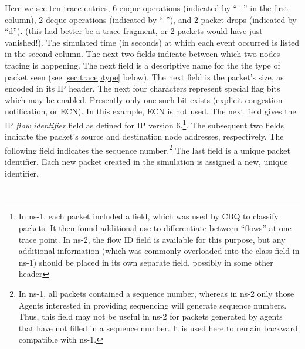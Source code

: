 Here we see ten trace entries, 6 enque operations (indicated by ``+''
in the first column), 2 deque operations (indicated by ``-''),
and 2 packet drops (indicated by ``d'').
(this had better be a trace fragment, or 2 packets would have just vanished!).
The simulated time (in seconds) at which each event occurred is listed
in the second column.
The next two fields indicate between which two nodes tracing is happening.
The next field is a descriptive name for the the type of packet seen
(see \ref{sec:traceptype} below).
The next field is the packet's size, as encoded in its IP header.
The next four characters represent special flag bits which may be
enabled.  Presently only one such bit exists (explicit congestion
notification, or {\sf ECN}).  In this example, {\sf ECN} is not used.
The next field gives the IP {\em flow identifier} field as defined
for IP version 6.\footnote{In ns-1, each packet included a 
field, which was used by CBQ to classify packets.
It then found additional use to differentiate between
``flows'' at one trace point.  In ns-2, the flow ID field is available
for this purpose, but any additional information (which was commonly overloaded
into the class field in ns-1) should be placed in its own separate field,
possibly in some other header}.
The subsequent two fields indicate the packet's source and destination
node addresses, respectively.
The following field indicates the sequence number.\footnote{In ns-1,
all packets contained a sequence number, whereas in ns-2 only those
Agents interested in providing sequencing will generate sequence numbers.
Thus, this field may not be useful in ns-2 for packets generated by
agents that have not filled in a sequence number.  It is used here
to remain backward compatible with ns-1.}
The last field is a unique packet identifier.  Each new packet
created in the simulation is assigned a new, unique identifier.

\section{}

